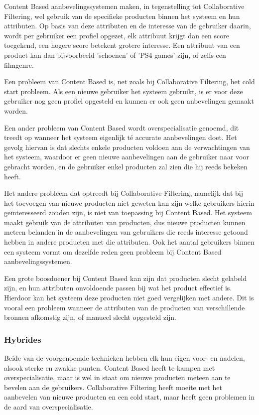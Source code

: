 Content Based aanbevelingssystemen \autocite{Lops2011} maken, in tegenstelling tot Collaborative Filtering, wel gebruik van de specifieke producten binnen het systeem en hun attributen. Op basis van deze attributen en de interesse van de gebruiker daarin, wordt per gebruiker een profiel opgezet, elk attribuut krijgt dan een score toegekend, een hogere score betekent grotere interesse. Een attribuut van een product kan dan bijvoorbeeld 'schoenen' of 'PS4 games' zijn, of zelfs een filmgenre.

Een probleem van Content Based is, net zoals bij Collaborative Filtering, het cold start probleem. Als een nieuwe gebruiker het systeem gebruikt, is er voor deze gebruiker nog geen profiel opgesteld en kunnen er ook geen anbevelingen gemaakt worden.

Een ander probleem van Content Based wordt overspecialisatie genoemd, dit treedt op wanneer het systeem eigenlijk té accurate aanbevelingen doet. Het gevolg hiervan is dat slechts enkele producten voldoen aan de verwachtingen van het systeem, waardoor er geen nieuwe aanbevelingen aan de gebruiker naar voor gebracht worden, en de gebruiker enkel producten zal zien die hij reeds bekeken heeft. 

Het andere probleem dat optreedt bij Collaborative Filtering, namelijk dat bij het toevoegen van nieuwe producten niet geweten kan zijn welke gebruikers hierin geïnteresseerd zouden zijn, is niet van toepassing bij Content Based. Het systeem maakt gebruik van de attributen van producten, dus nieuwe producten kunnen meteen belanden in de aanbevelingen van gebruikers die reeds interesse getoond hebben in andere producten met die attributen. Ook het aantal gebruikers binnen een systeem vormt om dezelfde reden geen probleem bij Content Based aanbevelingssystemen. 

Een grote boosdoener bij Content Based kan zijn dat producten slecht gelabeld zijn, en hun attributen onvoldoende passen bij wat het product effectief is. Hierdoor kan het systeem deze producten niet goed vergelijken met andere. Dit is vooral een probleem wanneer de attributen van de producten van verschillende bronnen afkomstig zijn, of manueel slecht opgesteld zijn.

\subsubsection{Hybrides}
\label{sec:Hybrides}

Beide van de voorgenoemde technieken hebben elk hun eigen voor- en nadelen, alsook sterke en zwakke punten. Content Based heeft te kampen met overspecialisatie, maar is wel in staat om nieuwe producten meteen aan te bevelen aan de gebruikers. Collaborative Filtering heeft moeite met het aanbevelen van nieuwe producten en een cold start, maar heeft geen problemen in de aard van overspecialisatie.

